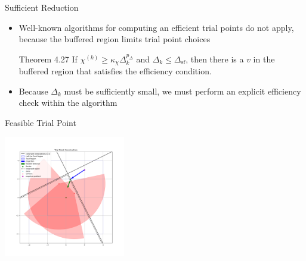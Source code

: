 \documentclass{beamer}
\newcommand{\dk}{{\Delta_k}}
\begin{document}

\begin{frame}{Sufficient Reduction}
	\begin{itemize}
		\item Well-known algorithms for computing an efficient trial points do not apply,
		because the buffered region limits trial point choices
		
		\begin{block}{Theorem 4.27}
			If $\chi^{(k)} \ge \kappa_{\chi} \Delta_k^{p_{\Delta}}$ and $\Delta_k \le \Delta_{\textrm{sf}}$,
			then there is a $v$ in the buffered region that satisfies the efficiency condition.
		\end{block}
		\item Because $\Delta_k$ must be sufficiently small, 
		we must perform an explicit efficiency check within the algorithm
		
	\end{itemize}
\end{frame}


\begin{frame}{Feasible Trial Point}
	\begin{center}
		\includegraphics[width=200px]{images/trial_point_constructions.png}
	\end{center}
\end{frame}
\end{document}
